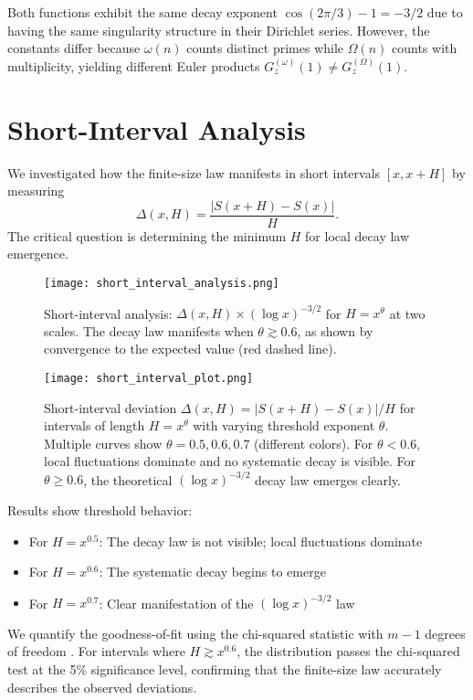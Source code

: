 \documentclass[12pt]{article}
\theoremstyle{definition}
\theoremstyle{remark}
\begin{document}
Both functions exhibit the same decay exponent $\cos(2\pi/3) - 1 = -3/2$ due to having the same singularity structure in their Dirichlet series. However, the constants differ because $\omega(n)$ counts distinct primes while $\Omega(n)$ counts with multiplicity, yielding different Euler products $G_z^{(\omega)}(1) \neq G_z^{(\Omega)}(1)$.

\section{Short-Interval Analysis}

We investigated how the finite-size law manifests in short intervals $[x, x+H]$ by measuring
\[
\Delta(x, H) = \frac{|S(x+H) - S(x)|}{H}.
\]
The critical question is determining the minimum $H$ for local decay law emergence.

\begin{figure}[ht]
\centering
\texttt{[image: short\_interval\_analysis.png]}
\caption{Short-interval analysis: $\Delta(x, H) \times (\log x)^{-3/2}$ for $H = x^\theta$ at two scales. The decay law manifests when $\theta \gtrsim 0.6$, as shown by convergence to the expected value (red dashed line).}
\label{fig:shortinterval_analysis}
\end{figure}

\begin{figure}[ht]
\centering
\texttt{[image: short\_interval\_plot.png]}
\caption{Short-interval deviation $\Delta(x, H) = |S(x+H) - S(x)|/H$ for intervals of length $H = x^\theta$ with varying threshold exponent $\theta$. Multiple curves show $\theta = 0.5, 0.6, 0.7$ (different colors). For $\theta < 0.6$, local fluctuations dominate and no systematic decay is visible. For $\theta \geq 0.6$, the theoretical $(\log x)^{-3/2}$ decay law emerges clearly.}
\label{fig:shortinterval}
\end{figure}

Results show threshold behavior:
\begin{itemize}
\item For $H = x^{0.5}$: The decay law is not visible; local fluctuations dominate
\item For $H = x^{0.6}$: The systematic decay begins to emerge
\item For $H = x^{0.7}$: Clear manifestation of the $(\log x)^{-3/2}$ law
\end{itemize}

We quantify the goodness-of-fit using the chi-squared statistic with $m-1$ degrees of freedom \cite{feller1968introduction}. For intervals where $H \gtrsim x^{0.6}$, the distribution passes the chi-squared test at the 5\% significance level, confirming that the finite-size law accurately describes the observed deviations.
\end{document}
